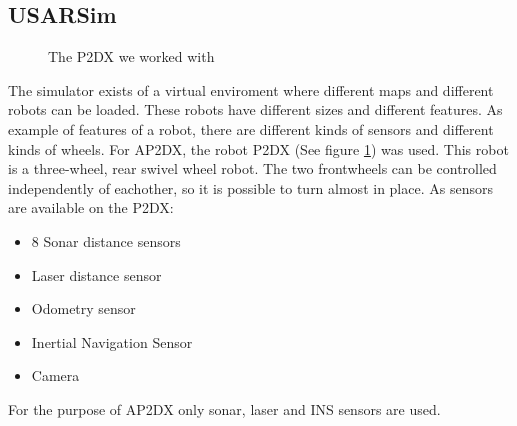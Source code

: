 \documentclass[titlepage, a4paper,10pt]{article}
\begin{document}
\subsection{USARSim}
\begin{figure}
  \centering
  \caption{The P2DX we worked with}
  \label{fig:p2dx}
\end{figure}
The simulator exists of a virtual enviroment where different maps and different
robots can be loaded. These robots have different sizes and different features.
As example of features of a robot, there are different kinds of sensors and
different kinds of wheels. For AP2DX, the robot P2DX (See figure \ref{fig:p2dx}) was used. This robot is a three-wheel, rear swivel wheel robot. The two frontwheels can be controlled independently of eachother, so it is possible to turn almost in place. As sensors are available on the P2DX:
\begin{itemize}
\item 8 Sonar distance sensors
\item Laser distance sensor
\item Odometry sensor
\item Inertial Navigation Sensor
\item Camera
\end{itemize}
For the purpose of AP2DX only sonar, laser and INS sensors are used.
\end{document}
